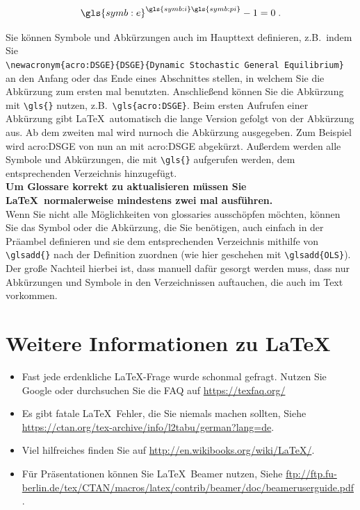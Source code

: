\documentclass[a4paper,12pt]{scrartcl} %
\begin{document}
\begin{equation}
	\gls{symb:e}^{\gls{symb:i}\gls{symb:pi}}-1=0 \;.
\end{equation}



Sie können Symbole und Abkürzungen auch im Haupttext definieren, z.B.\ indem Sie\\
\verb|\newacronym{acro:DSGE}{DSGE}{Dynamic Stochastic General Equilibrium}|\\
an den Anfang oder das Ende eines Abschnittes stellen, in welchem Sie die Abkürzung zum ersten mal benutzten. Anschließend können Sie die Abkürzung mit \verb|\gls{}| nutzen, z.B.\ \verb|\gls{acro:DSGE}|. Beim ersten Aufrufen einer Abkürzung gibt \LaTeX\ automatisch die lange Version gefolgt von der Abkürzung aus. Ab dem zweiten mal wird nurnoch die Abkürzung ausgegeben. Zum Beispiel wird \gls{acro:DSGE} von nun an mit \gls{acro:DSGE} abgekürzt. Außerdem werden alle Symbole und Abkürzungen, die mit \verb|\gls{}| aufgerufen werden, dem entsprechenden Verzeichnis hinzugefügt.\\
\textbf{Um Glossare korrekt zu aktualisieren müssen Sie \LaTeX\ normalerweise mindestens zwei mal ausführen.}\\

Wenn Sie nicht alle Möglichkeiten von glossaries ausschöpfen möchten, können Sie das Symbol oder die Abkürzung, die Sie benötigen, auch einfach in der Präambel definieren und sie dem entsprechenden Verzeichnis mithilfe von \verb|\glsadd{}| nach der Definition zuordnen (wie hier geschehen mit \verb|\glsadd{OLS}|). Der große Nachteil hierbei ist, dass manuell dafür gesorgt werden muss, dass nur Abkürzungen und Symbole in den Verzeichnissen auftauchen, die auch im Text vorkommen.



\clearpage

\section{Weitere Informationen zu \LaTeX}

\begin{itemize}
	\item Fast jede erdenkliche \LaTeX-Frage wurde schonmal gefragt. Nutzen Sie Google oder durchsuchen Sie die FAQ auf \url{https://texfaq.org/}
	\item Es gibt fatale \LaTeX\ Fehler, die Sie niemals machen sollten, Siehe \url{https://ctan.org/tex-archive/info/l2tabu/german?lang=de}.
	\item Viel hilfreiches finden Sie auf \url{http://en.wikibooks.org/wiki/LaTeX/}.
	\item Für Präsentationen können Sie \LaTeX\ Beamer nutzen, Siehe \url{ftp://ftp.fu-berlin.de/tex/CTAN/macros/latex/contrib/beamer/doc/beameruserguide.pdf}.
\end{itemize}
\end{document}

